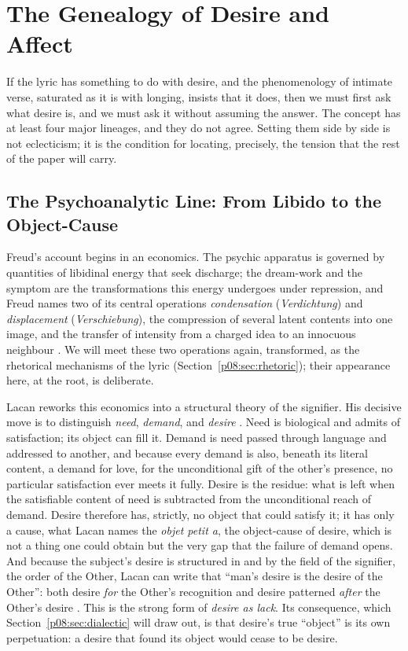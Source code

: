 \section{The Genealogy of Desire and Affect}\label{p08:sec:desire}

If the lyric has something to do with desire, and the phenomenology of intimate verse, saturated as it is with longing, insists that it does, then we must first ask what desire is, and we must ask it without assuming the answer. The concept has at least four major lineages, and they do not agree. Setting them side by side is not eclecticism; it is the condition for locating, precisely, the tension that the rest of the paper will carry.

\subsection{The Psychoanalytic Line: From Libido to the Object-Cause}

Freud's account begins in an economics. The psychic apparatus is governed by quantities of libidinal energy that seek discharge; the dream-work and the symptom are the transformations this energy undergoes under repression, and Freud names two of its central operations \emph{condensation} (\textit{Verdichtung}) and \emph{displacement} (\textit{Verschiebung}), the compression of several latent contents into one image, and the transfer of intensity from a charged idea to an innocuous neighbour \parencite{freud1900interpretation}. We will meet these two operations again, transformed, as the rhetorical mechanisms of the lyric (Section~\ref{p08:sec:rhetoric}); their appearance here, at the root, is deliberate.

Lacan reworks this economics into a structural theory of the signifier. His decisive move is to distinguish \emph{need}, \emph{demand}, and \emph{desire} \parencite{lacan1977ecrits}. Need is biological and admits of satisfaction; its object can fill it. Demand is need passed through language and addressed to another, and because every demand is also, beneath its literal content, a demand for love, for the unconditional gift of the other's presence, no particular satisfaction ever meets it fully. Desire is the residue: what is left when the satisfiable content of need is subtracted from the unconditional reach of demand. Desire therefore has, strictly, no object that could satisfy it; it has only a cause, what Lacan names the \textit{objet petit a}, the object-cause of desire, which is not a thing one could obtain but the very gap that the failure of demand opens. And because the subject's desire is structured in and by the field of the signifier, the order of the Other, Lacan can write that ``man's desire is the desire of the Other'': both desire \emph{for} the Other's recognition and desire patterned \emph{after} the Other's desire \parencite{lacan1977ecrits}. This is the strong form of \emph{desire as lack}. Its consequence, which Section~\ref{p08:sec:dialectic} will draw out, is that desire's true ``object'' is its own perpetuation: a desire that found its object would cease to be desire.

